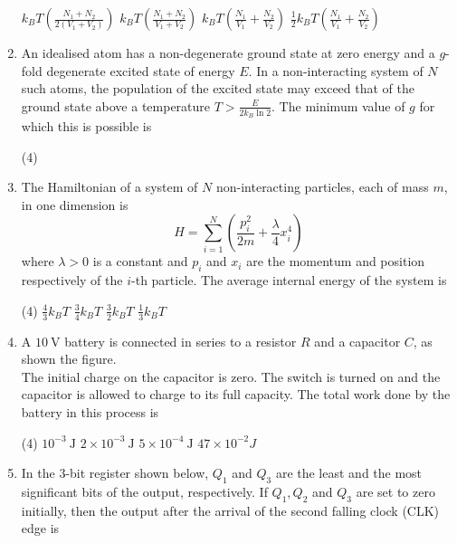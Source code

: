 \begin{enumerate}
\begin{tasks}
	\task[\textbf{a.}]$k_{B} T\left(\frac{N_{1}+N_{2}}{2\left(V_{1}+V_{2}\right)}\right)$
	\task[\textbf{b.}]$k_{B} T\left(\frac{N_{1}+N_{2}}{V_{1}+V_{2}}\right)$
	\task[\textbf{c.}]$k_{B} T\left(\frac{N_{1}}{V_{1}}+\frac{N_{2}}{V_{2}}\right)$
	\task[\textbf{d.}] $\frac{1}{2} k_{B} T\left(\frac{N_{1}}{V_{1}}+\frac{N_{2}}{V_{2}}\right)$
\end{tasks}
\item An idealised atom has a non-degenerate ground state at zero energy and a $g$-fold degenerate excited state of energy $E$. In a non-interacting system of $N$ such atoms, the population of the excited state may exceed that of the ground state above a temperature $T>\frac{E}{2 k_{B} \ln 2}$. The minimum value of $g$ for which this is possible is
 \begin{tasks}(4)
\end{tasks}
\item  The Hamiltonian of a system of $N$ non-interacting particles, each of mass $m$, in one dimension is
$$
H=\sum_{i=1}^{N}\left(\frac{p_{i}^{2}}{2 m}+\frac{\lambda}{4} x_{i}^{4}\right)
$$
where $\lambda>0$ is a constant and $p_{i}$ and $x_{i}$ are the momentum and position respectively of the $i$-th particle. The average internal energy of the system is
 \begin{tasks}(4)
	\task[\textbf{a.}]$\frac{4}{3} k_{B} T$
	\task[\textbf{b.}]$\frac{3}{4} k_{B} T$
	\task[\textbf{c.}] $\frac{3}{2} k_{B} T$
	\task[\textbf{d.}] $\frac{1}{3} k_{B} T$
\end{tasks}	
\item A $10 \mathrm{~V}$ battery is connected in series to a resistor $R$ and a capacitor $C$, as shown the figure.\\
The initial charge on the capacitor is zero. The switch is turned on and the capacitor is allowed to charge to its full capacity. The total work done by the battery in this process is
 \begin{tasks}(4)
	\task[\textbf{a.}]$10^{-3} \mathrm{~J}$
	\task[\textbf{b.}]$2 \times 10^{-3} \mathrm{~J}$
	\task[\textbf{c.}]$5 \times 10^{-4} \mathrm{~J}$
	\task[\textbf{d.}] $47 \times 10^{-2} J$
\end{tasks}
\item In the 3-bit register shown below, $Q_{1}$ and $Q_{3}$ are the least and the most significant bits of the output, respectively.
If $Q_{1}, Q_{2}$ and $Q_{3}$ are set to zero initially, then the output after the arrival of the second falling clock (CLK) edge is

\end{enumerate}
